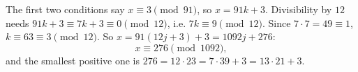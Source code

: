 The first two conditions say $x\equiv3\pmod{91}$, so $x=91k+3$. Divisibility by $12$ needs $91k+3\equiv7k+3\equiv0\pmod{12}$, i.e. $7k\equiv9\pmod{12}$. Since $7\cdot7=49\equiv1$, $k\equiv63\equiv3\pmod{12}$. So $x=91(12j+3)+3=1092j+276$:
\[\boxed{x\equiv276\pmod{1092}},\]
and the smallest positive one is $276=12\cdot23=7\cdot39+3=13\cdot21+3$.
